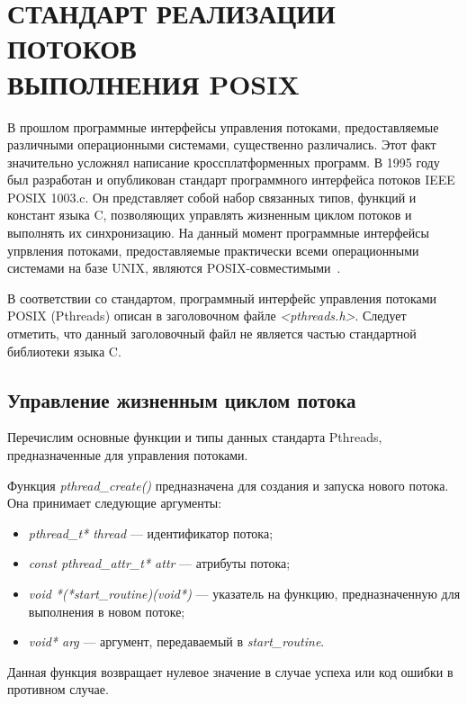 \section[Стандарт реализации потоков выполнения POSIX]{%
  СТАНДАРТ РЕАЛИЗАЦИИ ПОТОКОВ \\
  ВЫПОЛНЕНИЯ POSIX}

В прошлом программные интерфейсы управления потоками,
предоставляемые различными операционными системами, существенно различались.
Этот факт значительно усложнял написание кроссплатформенных программ.
В 1995 году был разработан и опубликован стандарт
программного интерфейса потоков IEEE POSIX 1003.c.
Он представляет собой набор связанных типов, функций и констант
языка C, позволяющих управлять жизненным циклом потоков
и выполнять их синхронизацию.
На данный момент программные интерфейсы упрвления потоками,
предоставляемые практически всеми операционными системами
на базе UNIX, являются POSIX-совместимыми~\cite{pthreads_programming}.

В соответствии со стандартом, программный интерфейс управления потоками
POSIX (Pthreads) описан в заголовочном файле \textit{<pthreads.h>}.
Следует отметить, что данный заголовочный файл не является частью
стандартной библиотеки языка C.

\subsection{Управление жизненным циклом потока}

Перечислим основные функции и типы данных стандарта Pthreads,
предназначенные для управления потоками.

Функция \textit{pthread\_create()} предназначена для создания и запуска
нового потока.
Она принимает следующие аргументы:
\begin{itemize}
  \item \textit{pthread\_t* thread} --- идентификатор потока;
  \item \textit{const pthread\_attr\_t* attr} --- атрибуты потока;
  \item \textit{void *(*start\_routine)(void*)} --- указатель на функцию,
    предназначенную для выполнения в новом потоке;
  \item \textit{void* arg} --- аргумент, передаваемый в \textit{start\_routine}.
\end{itemize}

Данная функция возвращает нулевое значение в случае успеха
или код ошибки в противном случае.

